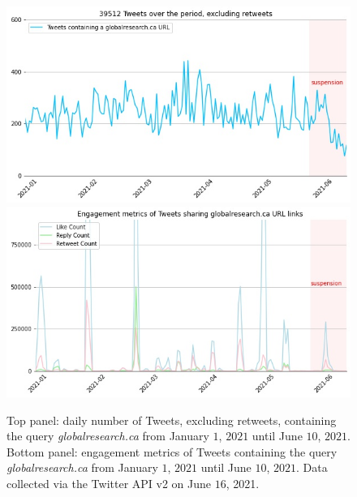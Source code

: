 \documentclass{article}
\begin{document}
\begin{figure}
\centering
		\includegraphics[scale=0.35]{./img/globalresearch/sum_globalresearch.ca_6_months.jpg} 
		\includegraphics[scale=0.35]{./img/globalresearch/engagement_sum_rolling_1_globalresearch.ca.jpg}
\caption{Top panel: daily number of Tweets, excluding retweets, containing the query {\it globalresearch.ca} from January $1$, $2021$ until June $10$, $2021$. Bottom panel: engagement metrics of Tweets containing the query {\it globalresearch.ca} from January $1$, $2021$ until June $10$, $2021$. Data collected via the Twitter API v2 on June $16$, 2021.   }
\label{fig4}
\end{figure}
\end{document}
